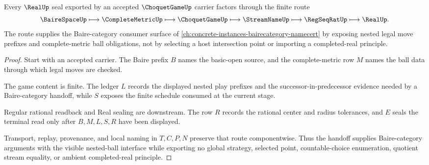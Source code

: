 \begin{theorem}
\label{thm:choquet-game-baire-category-handoff}
Every $\RealUp$ seal exported by an accepted $\ChoquetGameUp$ carrier factors through the finite route
$$
\BaireSpaceUp
\longmapsto
\CompleteMetricUp
\longmapsto
\ChoquetGameUp
\longmapsto
\StreamNameUp
\longmapsto
\RegSeqRatUp
\longmapsto
\RealUp .
$$
The route supplies the Baire-category consumer surface of \autoref{ch:concrete-instances-bairecategory-namecert} by exposing nested legal move prefixes and complete-metric ball obligations, not by selecting a host intersection point or importing a completed-real principle.
\end{theorem}
\begin{proof}
Start with an accepted carrier. The Baire prefix $B$ names the basic-open source, and the complete-metric row $M$ names the ball data through which legal moves are checked.

The game content is finite. The ledger $L$ records the displayed nested play prefixes and the successor-in-predecessor evidence needed by a Baire-category handoff, while $S$ exposes the finite schedule consumed at the current stage.

Regular rational readback and Real sealing are downstream. The row $R$ records the rational center and radius tolerances, and $E$ seals the terminal read only after $B,M,L,S,R$ have been displayed.

Transport, replay, provenance, and local naming in $T,C,P,N$ preserve that route componentwise. Thus the handoff supplies Baire-category arguments with the visible nested-ball interface while exporting no global strategy, selected point, countable-choice enumeration, quotient stream equality, or ambient completed-real principle.
\end{proof}


\begin{closurestatus}{\ChoquetGameUp}
  \theoryclosure{\seedClosure}
  \formalstatus{\unformalizedV}
\end{closurestatus}
